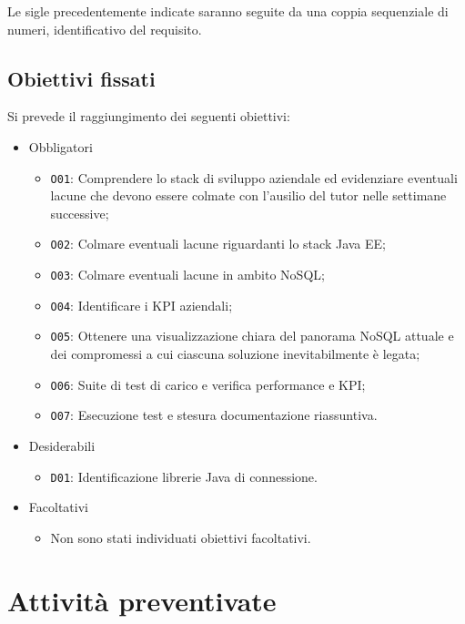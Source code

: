 \noindent Le sigle precedentemente indicate saranno seguite da una coppia sequenziale di numeri, identificativo del requisito.

\subsection{Obiettivi fissati}
Si prevede il raggiungimento dei seguenti obiettivi:
\begin{itemize}
    \item Obbligatori
    \begin{itemize}
        \item \texttt{O01}: Comprendere lo stack di sviluppo aziendale ed evidenziare eventuali lacune che devono essere colmate con l’ausilio del tutor nelle settimane successive;
        \item \texttt{O02}: Colmare eventuali lacune riguardanti lo stack Java EE;
        \item \texttt{O03}: Colmare eventuali lacune in ambito NoSQL;
        \item \texttt{O04}: Identificare i KPI aziendali;
        \item \texttt{O05}: Ottenere una visualizzazione chiara del panorama NoSQL attuale e dei compromessi a cui ciascuna soluzione inevitabilmente è legata;
        \item \texttt{O06}: Suite di test di carico e verifica performance e KPI;
        \item \texttt{O07}: Esecuzione test e stesura documentazione riassuntiva.
    \end{itemize}
    \item Desiderabili
    \begin{itemize}
        \item \texttt{D01}: Identificazione librerie Java di connessione.
    \end{itemize}
    \item Facoltativi
    \begin{itemize}
        \item Non sono stati individuati obiettivi facoltativi.
    \end{itemize}
\end{itemize}

\section{Attività preventivate}

